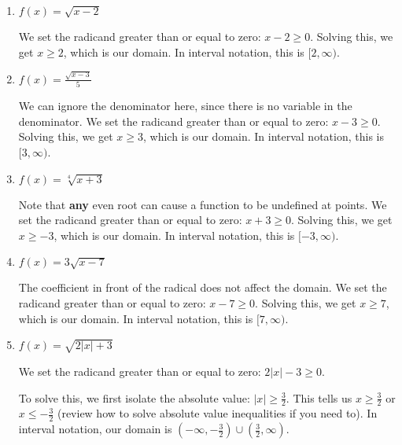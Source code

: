 \documentclass{ximera}
\begin{document}
\begin{enumerate}
	\item$f(x) = \sqrt{x - 2}$
		\begin{expandable}
			\begin{explanation}

We set the radicand greater than or equal to zero: $x - 2 \ge 0$. Solving this, we get $x \ge 2$, which is our domain. In interval notation, this is $[2, \infty)$. 
			\end{explanation}
		\end{expandable}
	\item $f(x) = \frac{\sqrt{x - 3}}{5}$
		\begin{expandable}
			\begin{explanation}

We can ignore the denominator here, since there is no variable in the denominator. We set the radicand greater than or equal to zero: $x - 3 \ge 0$. Solving this, we get $x \ge 3$, which is our domain. In interval notation, this is $[3, \infty)$. 
			\end{explanation}
		\end{expandable}
	\item $f(x) = \sqrt[4]{x + 3}$
		\begin{expandable}
			\begin{explanation}

Note that \textbf{any} even root can cause a function to be undefined at points. We set the radicand greater than or equal to zero: $x + 3 \ge 0$. Solving this, we get $x \ge -3$, which is our domain. In interval notation, this is $[-3, \infty)$.  
			\end{explanation}
		\end{expandable}
	\item $f(x) = 3\sqrt{x - 7}$
		\begin{expandable}
			\begin{explanation}

The coefficient in front of the radical does not affect the domain. We set the radicand greater than or equal to zero: $x -7 \ge 0$. Solving this, we get $x \ge 7$, which is our domain. In interval notation, this is $[7, \infty)$. 
			\end{explanation}
		\end{expandable}
	\item $f(x) = \sqrt{2|x| + 3}$
		\begin{expandable}
			\begin{explanation}

We set the radicand greater than or equal to zero: $2|x| - 3 \ge 0$.

To solve this, we first isolate the absolute value: $|x| \ge \frac{3}{2}$. This tells us $x \ge \frac{3}{2}$ or $x \le -\frac{3}{2}$ (review how to solve absolute value inequalities if you need to). In interval notation, our domain is $\left(-\infty, -\frac{3}{2}\right) \cup \left(\frac{3}{2}, \infty\right)$.
			\end{explanation}
		\end{expandable}
\end{enumerate}


\end{document}
